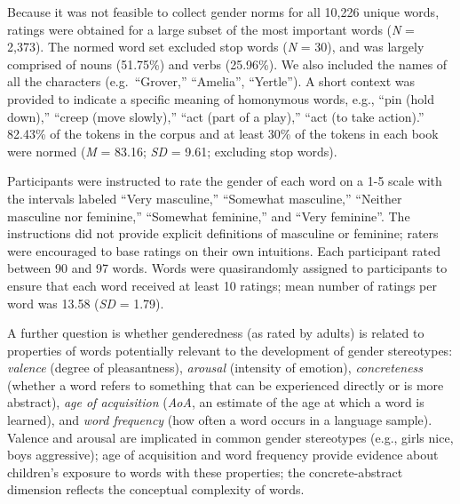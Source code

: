 \documentclass[
  english,
  ,man,floatsintext]{apa6}
\begin{document}
Because it was not feasible to collect gender norms for all 10,226 unique words, ratings were obtained for a large subset of the most important words (\emph{N} = 2,373). The normed word set excluded stop words (\emph{N} = 30), and was largely comprised of nouns (51.75\%) and verbs (25.96\%). We also included the names of all the characters (e.g.~\enquote{Grover,} \enquote{Amelia}, \enquote{Yertle}). A short context was provided to indicate a specific meaning of homonymous words, e.g., \enquote{pin (hold down),} \enquote{creep (move slowly),} \enquote{act (part of a play),} \enquote{act (to take action).} 82.43\% of the tokens in the corpus and at least 30\% of the tokens in each book were normed (\emph{M} = 83.16; \emph{SD} = 9.61; excluding stop words).

Participants were instructed to rate the gender of each word on a 1-5 scale with the intervals labeled \enquote{Very masculine,} \enquote{Somewhat masculine,} \enquote{Neither masculine nor feminine,} \enquote{Somewhat feminine,} and \enquote{Very feminine}. The instructions did not provide explicit definitions of masculine or feminine; raters were encouraged to base ratings on their own intuitions. Each participant rated between 90 and 97 words. Words were quasirandomly assigned to participants to ensure that each word received at least 10 ratings; mean number of ratings per word was 13.58 (\emph{SD} = 1.79).

A further question is whether genderedness (as rated by adults) is related to properties of words potentially relevant to the development of gender stereotypes: \emph{valence} (degree of pleasantness), \emph{arousal} (intensity of emotion), \emph{concreteness} (whether a word refers to something that can be experienced directly or is more abstract), \emph{age of acquisition} (\emph{AoA}, an estimate of the age at which a word is learned), and \emph{word frequency} (how often a word occurs in a language sample). Valence and arousal are implicated in common gender stereotypes (e.g., girls nice, boys aggressive); age of acquisition and word frequency provide evidence about children's exposure to words with these properties; the concrete-abstract dimension reflects the conceptual complexity of words.
\end{document}
